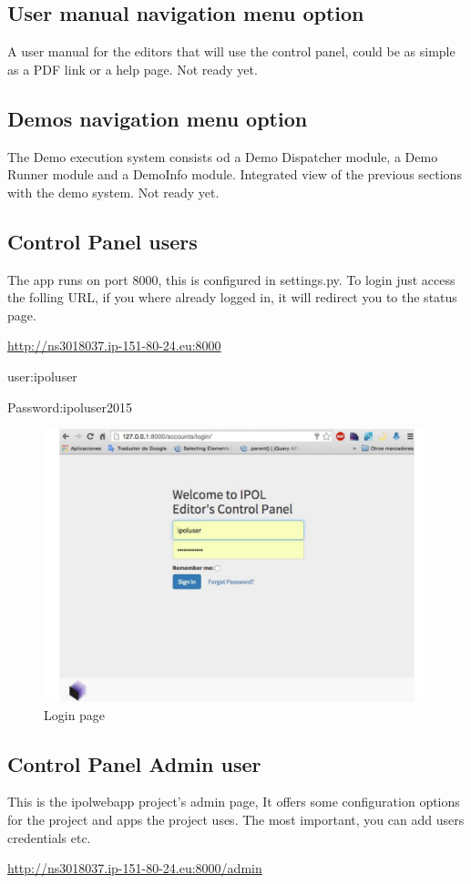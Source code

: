 \subsection{User manual navigation menu option}
A user manual for the editors that will use the control panel, could be as simple as a PDF link or a help page.
Not ready yet.

\subsection{Demos navigation menu option}
The Demo execution system consists od a Demo Dispatcher module, a Demo Runner module and a DemoInfo module.
Integrated view of the previous sections with the demo system.
Not ready yet.

\subsection{Control Panel users}
The app runs on port 8000, this is configured in settings.py.
To login just access the folling URL, if you where already logged in, it will redirect you to the status page.

\url{http://ns3018037.ip-151-80-24.eu:8000}

user:ipoluser

Password:ipoluser2015

\begin{figure}[!ht]
\centering
\includegraphics[width=0.5\columnwidth]{images/login}
\caption{Login page} 
\label{fi:login_page}
\end{figure}

\subsection{Control Panel Admin user}
This is the ipolwebapp project's admin page, 
It offers some configuration options for the project and apps the project uses. The most important, you can add users credentials etc.

\url{http://ns3018037.ip-151-80-24.eu:8000/admin}

